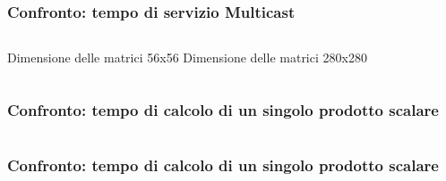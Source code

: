 \documentclass{beamer}
\begin{document}
\begin{frame}
  \frametitle{Confronto: tempo di servizio Multicast}
  \begin{columns}
    Dimensione delle matrici 56x56
    Dimensione delle matrici 280x280
  \end{columns}
  \vspace{5mm}
  \begin{columns}[c]
    \resizebox{\columnwidth}{!}{}
    \resizebox{\columnwidth}{!}{}
  \end{columns}  
\end{frame}

\begin{frame}
  \frametitle{Confronto: tempo di calcolo di un singolo prodotto scalare}
  \begin{columns}[c]
    \resizebox{\columnwidth}{!}{}
    \resizebox{\columnwidth}{!}{}
  \end{columns} 
\end{frame}

\begin{frame}
  \frametitle{Confronto: tempo di calcolo di un singolo prodotto scalare}
  \begin{columns}[c]
    \resizebox{\columnwidth}{!}{}
    \resizebox{\columnwidth}{!}{}
  \end{columns} 
\end{frame}
\end{document}
